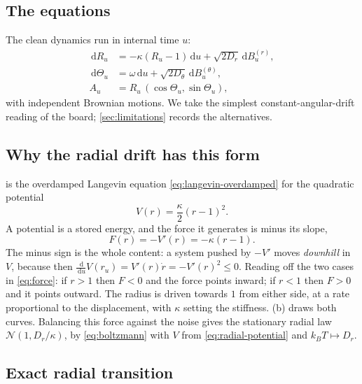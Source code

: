 \documentclass[11pt,a4paper]{article}
\newcommand{\N}{\mathcal{N}}
\newcommand{\dd}{\,\mathrm d}
\begin{document}
\subsection{The equations}

The clean dynamics run in internal time $u$:
\begin{align}
 \dd R_u&=-\kappa(R_u-1)\dd u+\sqrt{2D_r}\dd B_u^{(r)},
 \label{eq:radial-sde}\\
 \dd\Theta_u&=\omega\dd u+\sqrt{2D_\theta}\dd B_u^{(\theta)},
 \label{eq:angular-sde}\\
 A_u&=R_u\,(\cos\Theta_u,\sin\Theta_u),
 \label{eq:polar-to-cart}
\end{align}
with independent Brownian motions. We take the simplest constant-angular-drift reading of the
board; \cref{sec:limitations} records the alternatives.

\subsection{Why the radial drift has this form}

 is the overdamped Langevin equation \eqref{eq:langevin-overdamped} for the
quadratic potential
\begin{equation}
 V(r)=\frac{\kappa}{2}(r-1)^2 .
 \label{eq:radial-potential}
\end{equation}
A potential is a stored energy, and the force it generates is minus its slope,
\begin{equation}
 F(r)=-V'(r)=-\kappa(r-1) .
 \label{eq:force}
\end{equation}
The minus sign is the whole content: a system pushed by $-V'$ moves \emph{downhill} in $V$,
because then $\tfrac{\dd}{\dd u}V(r_u)=V'(r)\dot r=-V'(r)^2\le0$. Reading off the two cases in
\eqref{eq:force}: if $r>1$ then $F<0$ and the force points inward; if $r<1$ then $F>0$ and it
points outward. The radius is driven towards $1$ from either side, at a rate proportional to
the displacement, with $\kappa$ setting the stiffness. (b) draws both
curves. Balancing this force against the noise gives the stationary radial law
$\N(1,D_r/\kappa)$, by \eqref{eq:boltzmann} with $V$ from \eqref{eq:radial-potential} and
$k_BT\mapsto D_r$.

\subsection{Exact radial transition}\label{sec:radial-transition}
\end{document}
